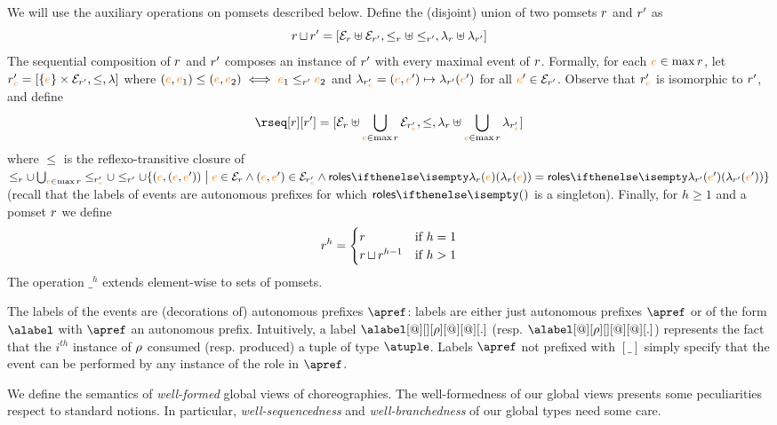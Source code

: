 %
We will use the auxiliary operations on pomsets described below.
%
Define the (disjoint) union of two pomsets $r$ and $r'$ as
\[
  r \operatorname{\sqcup} r' =
  [\mathcal{E}_{r} \uplus \mathcal{E}_{r'},
  \leq_{r} \uplus \leq_{r'},
  \lambda_{r} \uplus \lambda_{r'}]
\]
The sequential composition of $r$ and $r'$ composes an
instance of $r'$ with every maximal event of $r$.
%
Formally, for each ${\color{orange}{e}} \in \max r$, let
$r'_{{\color{orange}{e}}} = [\{{\color{orange}{e}}\} \times \mathcal{E}_{r'}, \leq, \lambda]$ where
$({\color{orange}{e}},{\color{orange}{e}}_1) \leq ({\color{orange}{e}},{\color{orange}{e}}_2) \iff {\color{orange}{e}}_1 \leq_{r'} {\color{orange}{e}}_2$ and
$\lambda_{r'_{{\color{orange}{e}}}} = ({\color{orange}{e}},{\color{orange}{e}}') \mapsto \lambda_{r'}({\color{orange}{e}}')$ for
all ${\color{orange}{e}}' \in \mathcal{E}_{r'}$.
%
Observe that $r'_{{\color{orange}{e}}}$ is isomorphic to $r'$, and define
\[
  \rseq[\apom][\apom'] = 
  [\esetof{\apom} \uplus \bigcup_{\ae \in \max \apom}\esetof{\apom'_{\ae}},
  \leq,
  \alfof{\apom} \uplus \bigcup_{\ae \in \max \apom}\alfof{\apom'_{\ae}}]
\]
where $\leq$ is the reflexo-transitive closure of
$\leqof{\apom} \cup \bigcup_{\ae \in \max \apom}\leqof{\apom'_{\ae}}
\cup \leqof{\apom'} \cup \{(\ae,(\ae,\ae')) \sst \ae \in
\esetof{\apom} \land (\ae,\ae') \in \esetof{\apom'_{\ae}} \land
\roles{\alfof{\apom}(\ae)} = \roles{\alfof{\apom'}(\ae')}\}$ (recall
that the labels of events are autonomous prefixes for which
$\roles{}$ is a singleton).
%
%
Finally, for $h \geq 1$ and a pomset $r$ we define
\[
  r^h =
  \begin{cases}
    r & \text{if } h = 1
    \\
    r \operatorname{\sqcup} r^{h-1} & \text{if } h > 1
  \end{cases}
\]
The operation $\_^h$ extends element-wise to sets of pomsets.

The labels of the events are (decorations of) autonomous prefixes
$\apref$: labels are either just autonomous prefixes $\apref$
or of the form $\alabel$ with $\apref$ an autonomous prefix.
%
Intuitively, a label $\alabel[@][][\arole][@][@][.]$
(resp. $\alabel[@][\arole][][@][@][.]$) represents the fact that the
$i^\mathit{th}$ instance of $\rho$ consumed (resp. produced) a tuple
of type $\atuple$.
%
Labels $\apref$ not prefixed with $[\_]$ simply specify that the event
can be performed by any instance of the role in $\apref$.

We define the semantics of \emph{well-formed} global views of
choreographies.
%
The well-formedness of our global views presents some peculiarities
respect to standard notions.
%
In particular, \emph{well-sequencedness} and \emph{well-branchedness}
of our global types need some care.

